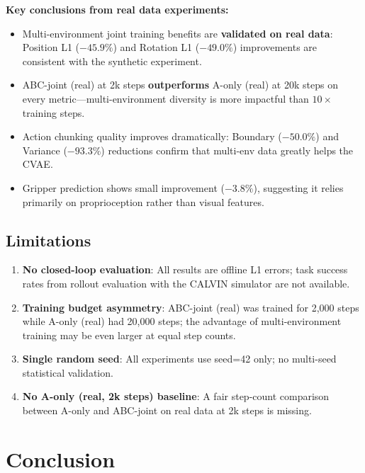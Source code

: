 \documentclass[10pt,twocolumn]{article}
\begin{document}
\textbf{Key conclusions from real data experiments:}
\begin{itemize}[nosep]
    \item Multi-environment joint training benefits are \textbf{validated on real data}: Position L1 ($-45.9\%$) and Rotation L1 ($-49.0\%$) improvements are consistent with the synthetic experiment.
    \item ABC-joint (real) at 2k steps \textbf{outperforms} A-only (real) at 20k steps on every metric---multi-environment diversity is more impactful than $10\times$ training steps.
    \item Action chunking quality improves dramatically: Boundary ($-50.0\%$) and Variance ($-93.3\%$) reductions confirm that multi-env data greatly helps the CVAE.
    \item Gripper prediction shows small improvement ($-3.8\%$), suggesting it relies primarily on proprioception rather than visual features.
\end{itemize}

\subsection{Limitations}

\begin{enumerate}[nosep]
    \item \textbf{No closed-loop evaluation}: All results are offline L1 errors; task success rates from rollout evaluation with the CALVIN simulator are not available.
    \item \textbf{Training budget asymmetry}: ABC-joint (real) was trained for 2,000 steps while A-only (real) had 20,000 steps; the advantage of multi-environment training may be even larger at equal step counts.
    \item \textbf{Single random seed}: All experiments use seed=42 only; no multi-seed statistical validation.
    \item \textbf{No A-only (real, 2k steps) baseline}: A fair step-count comparison between A-only and ABC-joint on real data at 2k steps is missing.
\end{enumerate}

\section{Conclusion}
\end{document}
